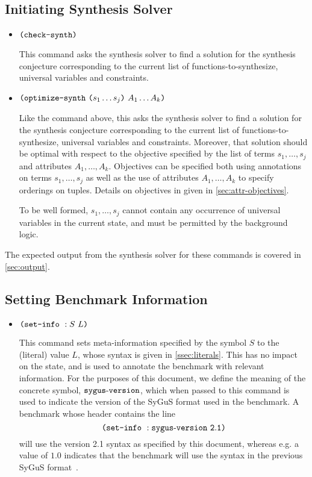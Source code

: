 \documentclass[english,a4paper,10pt]{article}
\begin{document}
\subsection{Initiating Synthesis Solver}

\begin{itemize}
\item $\texttt{(}\texttt{check-synth}\texttt{)}$

This command asks the synthesis solver to find a solution for the synthesis conjecture
corresponding to the current list of functions-to-synthesize,
universal variables and constraints.

\item $\texttt{(}\texttt{optimize-synth}\mbox{ }\texttt{(}s_1 \ldots s_j\texttt{)}\mbox{ } A_1 \ldots A_k\texttt{)}$

Like the command above,
this asks the synthesis solver to find a solution for the synthesis conjecture
corresponding to the current list of functions-to-synthesize,
universal variables and constraints.
Moreover, that solution should be optimal with respect to the objective
specified by the list of terms $s_1, \ldots, s_j$ and attributes $A_1, \ldots, A_k$.
Objectives can be specified both using annotations on terms $s_1, \ldots, s_j$
as well as the use of attributes $A_1, \ldots, A_k$ to specify orderings on tuples.
Details on objectives in given in \cref{sec:attr-objectives}.

To be well formed, $s_1, \ldots, s_j$ cannot contain any occurrence
of universal variables in the current state,
and must be permitted by the background logic.
\end{itemize}

The expected output
from the synthesis solver for these commands is covered in \cref{sec:output}.

\subsection{Setting Benchmark Information}

\begin{itemize}
\item $\texttt{(}\texttt{set-info}\mbox{ }:S\mbox{ }L\texttt{)}$

This command sets meta-information specified by the symbol $S$
to the (literal) value $L$, whose syntax is given in \cref{ssec:literals}.
This has no impact on the state, and is used to annotate the
benchmark with relevant information.
For the purposes of this document, we define the meaning of
the concrete symbol, ${\tt sygus\mbox{-}version}$,
which when passed to this command is used to indicate the version of the SyGuS
format used in the benchmark.
A benchmark whose header contains the line
\[
\texttt{(}\texttt{set-info}\mbox{ }:{\tt sygus\mbox{-}version\mbox{ }2.1}\texttt{)}
\]
will use the version 2.1 syntax as specified by this document,
whereas e.g. a value of $1.0$ indicates that the benchmark will use the
syntax in the previous SyGuS format~\cite{sygusFormat,sygusSyntax2015,sygusSyntax2016}.
\end{itemize}
\end{document}
